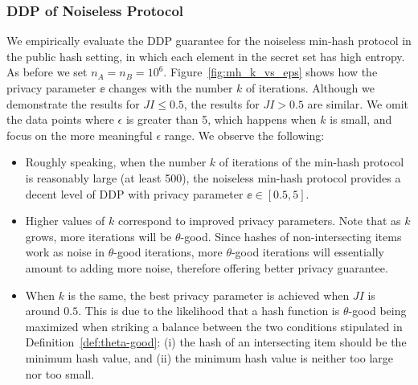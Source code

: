 \subsubsection{DDP of Noiseless Protocol}
We empirically evaluate the DDP guarantee
for the noiseless min-hash protocol in the public hash setting, in which each element in the secret set has high entropy. 
As before we set $n_A = n_B = 10^6$. 
%
Figure~\ref{fig:mh_k_vs_eps} shows how the privacy parameter $\ee$ changes with the number $k$ of iterations. Although we demonstrate the results for $JI \leq 0.5$,  the results for $JI > 0.5$ are similar. We omit the data points where $\epsilon$ is greater than 5, which happens when $k$ is small, and focus on the more meaningful $\epsilon$ range. 
We observe the following:


\begin{itemize}
\item 
Roughly speaking, when the number $k$ of iterations of the min-hash protocol is
reasonably large (at least 500), the noiseless min-hash protocol provides a
decent level of DDP with privacy parameter $\ee \in [0.5, 5]$. 

\item 
Higher values of $k$ correspond to improved privacy parameters.  Note that as
$k$ grows, more iterations will be $\theta$-good. Since hashes of
non-intersecting items work as noise in $\theta$-good iterations, more
$\theta$-good iterations will essentially amount to adding more noise, therefore
offering better privacy guarantee.

\item 
When $k$ is the same, the best privacy parameter is achieved when $JI$ is around $0.5$. 
This is due to the likelihood that a hash function is $\theta$-good being maximized when striking a balance between the two conditions stipulated in Definition~\ref{def:theta-good}: (i) the hash of an intersecting item should be the minimum hash value, and (ii) the minimum hash value is neither too large nor too small. 
\end{itemize}




